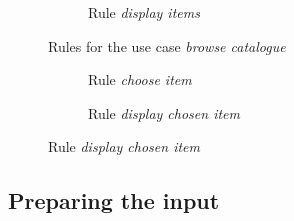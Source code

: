 \begin{example}
\begin{figure}[!ht]
  \begin{subfigure}[t]{.5\textwidth}
    \centerline{}
    \caption{Rule \emph{display items}}
  \end{subfigure}
  \caption{Rules for the use case \emph{browse catalogue}}\label{fig:tests:grammar}
\end{figure}

\begin{figure}[!]
\ContinuedFloat
\centering
  \begin{subfigure}[t]{.5\textwidth}
    \centerline{}
    \caption{Rule \emph{choose item}}
  \end{subfigure}

  \begin{subfigure}[t]{.5\textwidth}
    \centerline{}
    \caption{Rule \emph{display chosen item}}
  \end{subfigure}
\end{figure}
\end{example}


\subsection{Preparing the input}

